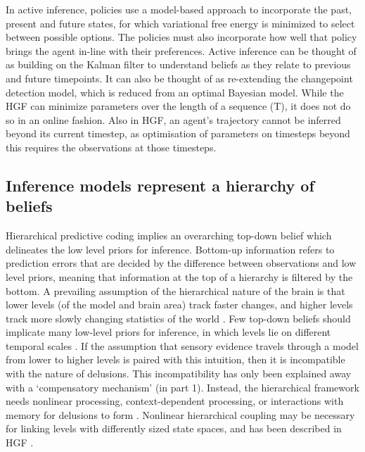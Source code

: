\documentclass{article}
\begin{document}
In active inference, policies use a model-based approach to incorporate the past, present and future states, for which variational free energy is minimized to select between possible options. The policies must also incorporate how well that policy brings the agent in-line with their preferences. Active inference can be thought of as building on the Kalman filter to understand beliefs as they relate to previous and future timepoints. It can also be thought of as re-extending the changepoint detection model, which is reduced from an optimal Bayesian model. While the HGF can minimize parameters over the length of a sequence (T), it does not do so in an online fashion. Also in HGF, an agent's trajectory cannot be inferred beyond its current timestep, as optimisation of parameters on timesteps beyond this requires the observations at those timesteps.

\subsection{Inference models represent a hierarchy of beliefs}

Hierarchical predictive coding implies an overarching top-down belief which delineates the low level priors for inference. Bottom-up information refers to prediction errors that are decided by the difference between observations and low level priors, meaning that information at the top of a hierarchy is filtered by the bottom. A prevailing assumption of the hierarchical nature of the brain is that lower levels (of the model and brain area) track faster changes, and higher levels track more slowly changing statistics of the world \citep{kiebel2008hierarchy}. Few top-down beliefs should implicate many low-level priors for inference, in which levels lie on different temporal scales \citep{friston2018deep}. If the assumption that sensory evidence travels through a model from lower to higher levels is paired with this intuition, then it is incompatible with the nature of delusions. This incompatibility has only been explained away with a ‘compensatory mechanism’ (in part 1). Instead, the hierarchical framework needs nonlinear processing, context-dependent processing, or interactions with memory for delusions to form \citep{sterzer2018predictive}. Nonlinear hierarchical coupling may be necessary for linking levels with differently sized state spaces, and has been described in HGF \citep{weber2023generalized}.
\end{document}
